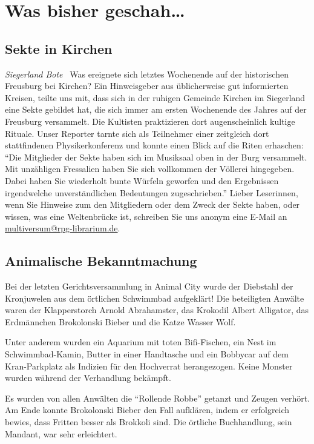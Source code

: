 \documentclass[final]{multiversum}
\begin{document}
\makemultititle
%

\section{Was bisher geschah\ldots}

\subsection{Sekte in Kirchen}
\textit{Siegerland Bote} \textendash\ Was ereignete sich letztes Wochenende auf
der historischen Freusburg bei Kirchen? Ein Hinweisgeber aus üblicherweise gut
informierten Kreisen, teilte uns mit, dass sich in der ruhigen Gemeinde Kirchen
im Siegerland eine Sekte gebildet hat, die sich immer am ersten Wochenende des
Jahres auf der Freusburg versammelt. Die Kultisten praktizieren dort
augenscheinlich kultige Rituale. Unser Reporter tarnte sich als Teilnehmer einer
zeitgleich dort stattfindenen Physikerkonferenz und konnte einen Blick auf die
Riten erhaschen: \enquote{Die Mitglieder der Sekte haben sich im Musiksaal oben
in der Burg versammelt. Mit unzähligen Fressalien haben Sie sich vollkommen der
Völlerei hingegeben. Dabei haben Sie wiederholt bunte Würfeln geworfen und den
Ergebnissen irgendwelche unverständlichen Bedeutungen zugeschrieben.} Lieber
Leserinnen, wenn Sie Hinweise zum den Mitgliedern oder dem Zweck der Sekte
haben, oder wissen, was eine Weltenbrücke ist, schreiben Sie uns anonym eine
E-Mail an \url{multiversum@rpg-librarium.de}.


\subsection{Animalische Bekanntmachung}
Bei der letzten Gerichtsversammlung in Animal City wurde der Diebstahl der
Kronjuwelen aus dem örtlichen Schwimmbad aufgeklärt!  Die beteiligten Anwälte
waren der Klapperstorch Arnold Abrahamster, das Krokodil Albert Alligator, das
Erdmännchen Brokolonski Bieber und die Katze Wasser Wolf.

Unter anderem wurden
ein Aquarium mit toten Bifi-Fischen, ein Nest im Schwimmbad-Kamin, Butter in
einer Handtasche und ein Bobbycar auf dem Kran-Parkplatz als Indizien für den
Hochverrat herangezogen.  Keine Monster wurden während der Verhandlung bekämpft.

Es wurden von allen Anwälten die \enquote{Rollende Robbe} getanzt und Zeugen
verhört.  Am Ende konnte Brokolonski Bieber den Fall aufklären, indem er
erfolgreich bewies, dass Fritten besser als Brokkoli sind.  Die örtliche
Buchhandlung, sein Mandant, war sehr erleichtert.
\end{document}
